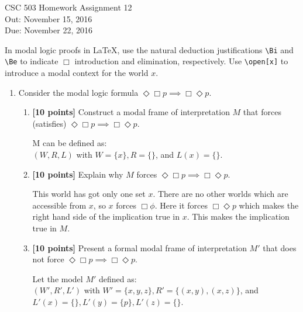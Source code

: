 \documentclass{article}
\begin{document}
\begin{center}
  {\LARGE CSC 503 Homework Assignment 12}\\[1pc]
  Out: November 15, 2016 \\
  Due: November 22, 2016 \\
\end{center}

\def\Bi{\by{$\Box$i}}
\def\Be{\by{$\Box$e}}

In modal logic proofs in LaTeX, use the natural deduction
justifications \verb+\Bi+ and \verb+\Be+ to indicate $\Box$
introduction and elimination, respectively.  Use \verb+\open[x]+ to
introduce a modal context for the world $x$.

\begin{enumerate}

\item  Consider the modal logic formula
  $\Diamond\Box p \implies \Box\Diamond p$.
  \begin{enumerate}
\item \textbf{[10 points]} Construct a modal frame of interpretation
    $M$ that forces (satisfies)
    $\Diamond\Box p \implies \Box\Diamond p$.
    \begin{answer}
    M can be defined as: \\
    $(W,R,L)$ with $W = \{x\}, R = \{\}$, and $L(x) =\{\}$. 
    \end{answer}

  \item \textbf{[10 points]} Explain why $M$ forces
    $\Diamond\Box p \implies \Box\Diamond p$.
    \begin{answer}
    This world has got only one set $x$. There are no other worlds which are accessible from $x$, so $x$ forces $\Box \phi$. Here it forces $\Box \Diamond p$ which makes the right hand side of the implication true in $x$. This makes the implication true in $M$.
    \end{answer}

  \item \textbf{[10 points]} Present a formal modal frame of
    interpretation $M'$ that does not force
    $\Diamond\Box p \implies \Box\Diamond p$.
    \begin{answer}
    Let the model $M'$ defined as: \\
    $(W',R',L')$ with $W' = \{x,y,z\}, R' = \{(x,y),(x,z)\}$, and $L'(x) =\{\}, L'(y) = \{p\}, L'(z) = \{\}$.
    \end{answer}


\end{enumerate}
\end{enumerate}
\end{document}
